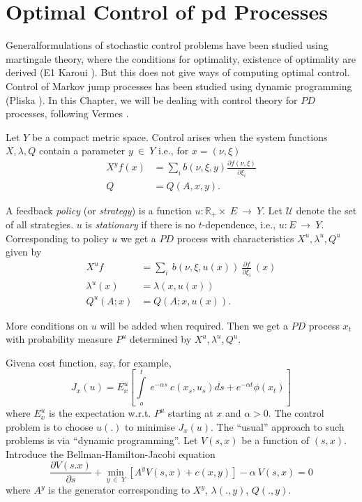 
\chapter{Optimal Control of pd Processes}\label{chap2} %

General\pageoriginale formulations of stochastic control problems have
been studied 
using martingale theory, where the conditions for optimality,
existence of optimality are derived (E1 Karoui \cite{key15}). But this
does not give ways of computing optimal control. Control of Markov
jump processes has been studied using dynamic programming (Pliska
\cite{key21}). In this Chapter, we will be dealing with control theory for
$PD$ processes, following Vermes \cite{key25}. 

Let $Y$ be a compact metric space. Control arises when the system
functions $X, \lambda, Q$ contain a parameter $y ~ \in  ~ Y$
i.e., for $x = (\nu, \xi)$ 
\begin{align*}
  X^yf(x) & = \sum_i b(\nu,\xi,y) \frac{\partial f(\nu,\xi)}{\partial
    \xi_i}\\ 
  Q & = Q(A,x,y).
\end{align*}

A feedback \textit{policy} (or \textit{strategy}) is a function $u :
\mathbb{R}_+ \times ~ E ~ \rightarrow ~ Y$. Let $\mathscr{U}$ denote
the set of all strategies. $u$ is \textit{stationary} if there is no
$t$-dependence, i.e., $u : E ~ \rightarrow ~ Y$. Corresponding to
policy $u$ we get a $PD$ process with characteristics $ X^u,\lambda^u,
Q^u $ given by 
\begin{align*}
  X^u f & = \sum_i ~b(\nu,\xi,u(x)) ~ \frac{\partial f}{\partial
    \xi_i} ~ (x)\\ 
  \lambda^u(x) & = \lambda(x,u(x))\\
  Q^u(A;x) & = Q(A;x,u(x)).
\end{align*}

More conditions on $u$ will be added when required. Then we get a $PD$
process $x_t$ with probability measure $P^u$ determined by $X^u,
\lambda^u, Q^u$. 

Given\pageoriginale a cost function, say, for example,
$$
J_x(u) = E_x^u\left[\int\limits_o^t ~ e^{-\alpha s}~ c(x_s,u_s)ds +
  e^{-\alpha t}\phi(x_t)\right] 
$$
where $E_x^u$ is the expectation w.r.t. $P^u$ starting at $x$ and
$\alpha > 0$. The control problem is to choose $u(.)$ to minimise
$J_x(u)$. The ``usual'' approach to such problems is via ``dynamic
programming''. Let $V(s,x)$ be a function of $(s,x)$. Introduce the
Bellman-Hamilton-Jacobi equation 
\begin{equation}
  \frac{\partial V(s.x)}{\partial s} + \min_{y ~ \in  ~ Y}
       [A^yV(s,x) + c(x,y)] -\alpha ~V(s,x) = 0 \tag{B} 
\end{equation}
where $A^y$ is the generator corresponding to $X^y$, $\lambda(.,y)$,
$Q(.,y)$. 

